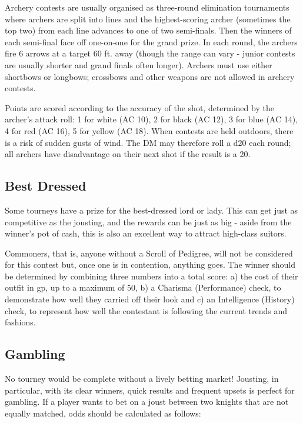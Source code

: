 \documentclass[10pt,a4paper,twoside,bg=print,twocolumn,openany,nodeprecatedcode]{dndbook}
\begin{document}
Archery contests are usually organised as three-round elimination tournaments where archers are split into lines and the highest-scoring archer (sometimes the top two) from each line advances to one of two semi-finals. Then the winners of each semi-final face off one-on-one for the grand prize. In each round, the archers fire 6 arrows at a target 60 ft. away (though the range can vary - junior contests are usually shorter and grand finals often longer). Archers must use either shortbows or longbows; crossbows and other weapons are not allowed in archery contests.

Points are scored according to the accuracy of the shot, determined by the archer's attack roll: 1 for white (AC 10), 2 for black (AC 12), 3 for blue (AC 14), 4 for red (AC 16), 5 for yellow (AC 18). When contests are held outdoors, there is a risk of sudden gusts of wind. The DM may therefore roll a d20 each round; all archers have disadvantage on their next shot if the result is a 20.

\subsection{Best Dressed}
Some tourneys have a prize for the best-dressed lord or lady. This can get just as competitive as the jousting, and the rewards can be just as big - aside from the winner's pot of cash, this is also an excellent way to attract high-class suitors.

Commoners, that is, anyone without a Scroll of Pedigree, will not be considered for this contest but, once one is in contention, anything goes. The winner should be determined by combining three numbers into a total score: a) the cost of their outfit in gp, up to a maximum of 50, b) a Charisma (Performance) check, to demonstrate how well they carried off their look and c) an Intelligence (History) check, to represent how well the contestant is following the current trends and fashions.

\subsection{Gambling}
No tourney would be complete without a lively betting market! Jousting, in particular, with its clear winners, quick results and frequent upsets is perfect for gambling. If a player wants to bet on a joust between two knights that are not equally matched, odds should be calculated as follows:
\end{document}
